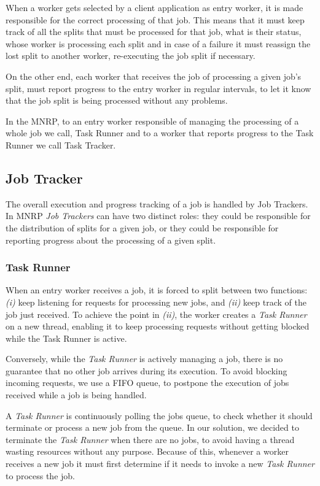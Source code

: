 \documentclass[times, 10pt,twocolumn]{article}
\begin{document}
        When a worker gets selected by a client application as entry worker, it is made responsible for the correct processing of that job. This means that it must keep track of all the splits that must be processed for that job, what is their status, whose worker is processing each split and in case of a failure it must reassign the lost split to another worker, re-executing the job split if necessary.

        On the other end, each worker that receives the job of processing a given job's split, must report progress to the entry worker in regular intervals, to let it know that the job split is being processed without any problems.

        In the \ac{MNRP}, to an entry worker responsible of managing the processing of a whole job we call, Task Runner and to a worker that reports progress to the Task Runner we call Task Tracker.

    	\subsection{Job Tracker}

        The overall execution and progress tracking of a job is handled by Job Trackers. In \ac{MNRP} \emph{Job Trackers} can have two distinct roles: they could be responsible for the distribution of splits for a given job, or they could be responsible for reporting progress about the processing of a given split.

            \subsubsection{Task Runner}

            When an entry worker receives a job, it is forced to split between two functions: {\it (i)} keep listening for requests for processing new jobs, and {\it (ii)} keep track of the job just received. To achieve the point in {\it (ii)}, the worker creates a \emph{Task Runner} on a new thread, enabling it to keep processing requests without getting blocked while the Task Runner is active.

            Conversely, while the \emph{Task Runner} is actively managing a job, there is no guarantee that no other job arrives during its execution. To avoid blocking incoming requests, we use a FIFO queue, to postpone the execution of jobs received while a job is being handled.

            A \emph{Task Runner} is continuously polling the jobs queue, to check whether it should terminate or process a new job from the queue. In our solution, we decided to terminate the \emph{Task Runner} when there are no jobs, to avoid having a thread wasting resources without any purpose. Because of this, whenever a worker receives a new job it must first determine if it needs to invoke a new \emph{Task Runner} to process the job.
\end{document}
